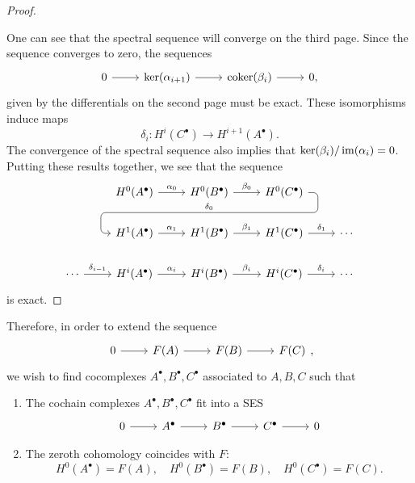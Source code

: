 \begin{proof}
\begin{center}
  \end{center}
  One can see that the spectral sequence will converge on the third
  page. Since the sequence converges to zero, the sequences
  \[\begin{tikzcd}
      0\rar & \ker(\alpha_{i+1})\rar & \coker(\beta_{i})\rar & 0,
    \end{tikzcd}\]
  given by the differentials on the second page must be exact.
  These isomorphisms induce maps
  \[\delta_{i}:H^{i}(C^{\bullet})\to H^{i+1}(A^{\bullet}).\]
  The convergence of the spectral sequence also implies that
  $\ker(\beta_{i})/\operatorname{im}(\alpha_{i})=0$. Putting these results together,
  we see that the sequence
  \[\begin{tikzcd}
    & H^{0}(A^{\bullet})\rar{\alpha_{0}} & H^{0}(B^{\bullet})
    \rar{\beta_{0}}\dar[phantom, ""{coordinate, name=Z}] & H^{0}(C^{\bullet})
    \arrow[rounded corners, to path={[pos=0] --
      ([xshift=2ex]\tikztostart.east) |- (Z) -|
      ([xshift=-2ex]\tikztotarget.west)\tikztonodes -- (\tikztotarget)},
    "\delta_{0}"']{dll} & \\
    & H^{1}(A^{\bullet})\rar{\alpha_{1}} & H^{1}(B^{\bullet})\rar{\beta_{1}}
    & H^{1}(C^{\bullet})\rar{\delta_{1}} & \cdots \\
    \cdots \rar{\delta_{i-1}}& H^{i}(A^{\bullet})\rar{\alpha_{i}}
    & H^{i}(B^{\bullet})\rar{\beta_{i}} & H^{i}(C^{\bullet})\rar{\delta_{i}}
    & \cdots
    \end{tikzcd}\]
  is exact.
\end{proof}

Therefore, in order to extend the sequence
\[\begin{tikzcd}
    0\rar & F(A)\rar & F(B)\rar & F(C)
  \end{tikzcd},\]
we wish to find cocomplexes $A^{\bullet}, B^{\bullet}, C^{\bullet}$
associated to $A, B, C$ such that
\begin{enumerate}
  \item The cochain complexes $A^{\bullet}, B^{\bullet}, C^{\bullet}$ fit into a
        SES
        \[\begin{tikzcd}
            0\rar & A^{\bullet}\rar & B^{\bullet}\rar & C^{\bullet}\rar & 0
          \end{tikzcd}\]
  \item The zeroth cohomology coincides with $F$:
        \[H^{0}(A^{\bullet})=F(A),
        \quad H^{0}(B^{\bullet})=F(B),
        \quad H^{0}(C^{\bullet})=F(C).\]
\end{enumerate}

